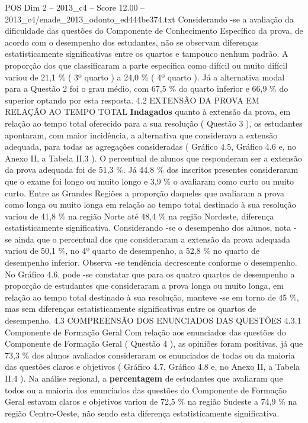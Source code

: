\begin{textsample}{POS Dim 2 – 2013\_c4 – Score 12.00 – 2013\_c4/enade\_2013\_odonto\_ed444be374.txt}
Considerando -se a avaliação da dificuldade das questões do Componente de Conhecimento Específico da prova, de acordo com o desempenho dos estudantes, não se observam diferenças estatisticamente significativas entre os quartos e tampouco nenhum padrão.
A proporção dos que classificaram a parte específica como difícil ou muito difícil variou de 21,1 \% ( 3º quarto ) a 24,0 \% ( 4º quarto ).
Já a alternativa modal para a Questão 2 foi o grau médio, com 67,5 \% do quarto inferior e 66,9 \% do superior optando por esta resposta. 4.2 EXTENSÃO DA PROVA EM RELAÇÃO AO TEMPO TOTAL \textbf{Indagados} quanto à extensão da prova, em relação ao tempo total oferecido para a sua resolução ( Questão 3 ), os estudantes apontaram, com maior incidência, a alternativa que considerava a extensão adequada, para todas as agregações consideradas ( Gráfico 4.5, Gráfico 4.6 e, no Anexo II, a Tabela II.3 ).
O percentual de alunos que responderam ser a extensão da prova adequada foi de 51,3 \%.
Já 44,8 \% dos inscritos presentes consideraram que o exame foi longo ou muito longo e 3,9 \% o avaliaram como curto ou muito curto.
Entre as Grandes Regiões a proporção daqueles que avaliaram a prova como longa ou muito longa em relação ao tempo total destinado à sua resolução variou de 41,8 \% na região Norte até 48,4 \% na região Nordeste, diferença estatisticamente significativa.
Considerando -se o desempenho dos alunos, nota -se ainda que o percentual dos que consideraram a extensão da prova adequada variou de 50,1 \%, no 4º quarto de desempenho, a 52,8 \% no quarto de desempenho inferior.
Observa -se tendência decrescente conforme o desempenho.
No Gráfico 4.6, pode -se constatar que para os quatro quartos de desempenho a proporção de estudantes que consideraram a prova longa ou muito longa, em relação ao tempo total destinado à sua resolução, manteve -se em torno de 45 \%, mas sem diferenças estatisticamente significativas entre os quartos de desempenho. 4.3 COMPREENSÃO DOS ENUNCIADOS DAS QUESTÕES 4.3.1 Componente de Formação Geral Com relação aos enunciados das questões do Componente de Formação Geral ( Questão 4 ), as opiniões foram positivas, já que 73,3 \% dos alunos avaliados consideraram os enunciados de todas ou da maioria das questões claros e objetivos ( Gráfico 4.7, Gráfico 4.8 e, no Anexo II, a Tabela II.4 ).
Na análise regional, a \textbf{percentagem} de estudantes que avaliaram que todos ou a maioria dos enunciados das questões do Componente de Formação Geral estavam claros e objetivos variou de 72,5 \% na região Sudeste a 74,9 \% na região Centro-Oeste, não sendo esta diferença estatisticamente significativa.

\end{textsample}
